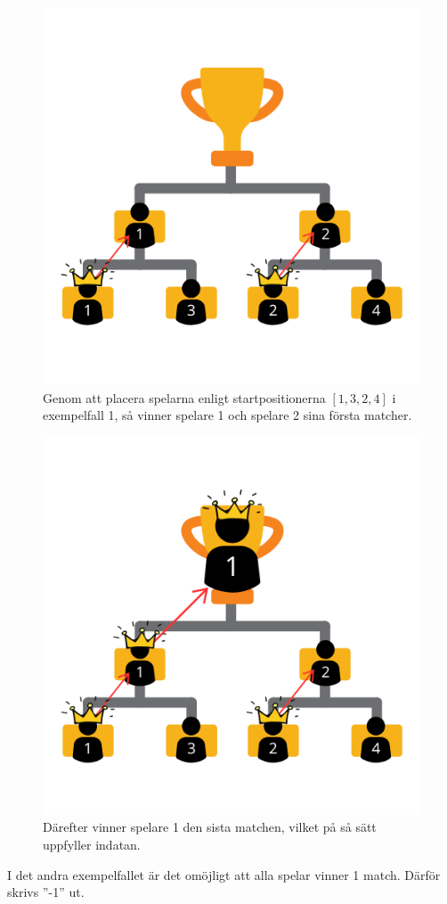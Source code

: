 \begin{centering}
  \begin{figure}[h]
      \centering
      \includegraphics[scale=0.7]{4.png}
    \caption{Genom att placera spelarna enligt startpositionerna $[1, 3, 2, 4]$ i exempelfall 1, så vinner spelare 1 och spelare 2 sina första matcher.}
  \end{figure}
\end{centering}

\begin{centering}
  \begin{figure}[h]
      \centering
      \includegraphics[scale=0.7]{6.png}
    \caption{Därefter vinner spelare 1 den sista matchen, vilket på så sätt uppfyller indatan.}
  \end{figure}
\end{centering}


I det andra exempelfallet är det omöjligt att alla spelar vinner 1 match. Därför skrivs ''-1'' ut.